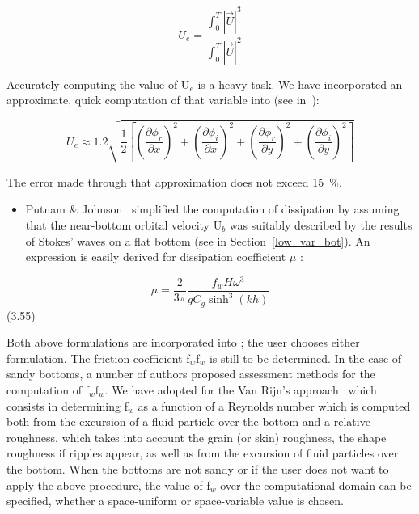 \begin{equation}
  U_e = \frac{\int_0^T|\overrightarrow{U}|^3}{\int_0^T|\overrightarrow{U}|^2}
  \label{eq:3.53}
\end{equation}

Accurately computing the value of U${}_{e}$ is a heavy task. We have
incorporated an approximate, quick computation of that variable into \artemis{}
(see in~\cite{Paugam}):

\begin{equation}
  U_e \approx 1.2\sqrt{\frac{1}{2}\left[
          \left(\frac{\partial \phi_r}{\partial x}\right)^2 +
          \left(\frac{\partial \phi_i}{\partial x}\right)^2 +
          \left(\frac{\partial \phi_r}{\partial y}\right)^2 +
          \left(\frac{\partial \phi_i}{\partial y}\right)^2
                                  \right]}
  \label{eq:3.54}
\end{equation}

The error made through that approximation does not exceed 15~\%.

\begin{itemize}
\item  Putnam \& Johnson~\cite{Putnam1949} simplified the computation of
  dissipation by assuming that the near-bottom orbital velocity U${}_{b}$ was
    suitably described by the results of Stokes' waves on a flat bottom (see in
    Section~\ref{low_var_bot}). An expression is easily derived for dissipation
    coefficient $\mu$ :
\end{itemize}

\begin{equation}
  \mu = \frac{2}{3\pi}\frac{f_w H \omega^3}{gC_g \sinh^3(kh)}
  \label{eq:3.55}
\end{equation}
   (3.55)

Both above formulations are incorporated into \artemis{}; the user chooses
either formulation. The friction coefficient f${}_{w}$f${}_{w}$ is still to be
determined. In the case of sandy bottoms, a number of authors proposed
assessment methods for the computation of f${}_{w}$f${}_{w}$. We have adopted
for \artemis{} the Van Rijn's approach~\cite{vanRijn1993} which consists in
determining f${}_{w}$ as a function of a Reynolds number which is computed both
from the excursion of a fluid particle over the bottom and a relative
roughness, which takes into account the grain (or skin) roughness, the shape
roughness if ripples appear, as well as from the excursion of fluid particles
over the bottom. When the bottoms are not sandy or if the user does not want to
apply the above procedure, the value of f${}_{w}$ over the computational domain
can be specified, whether a space-uniform or space-variable value is chosen.

